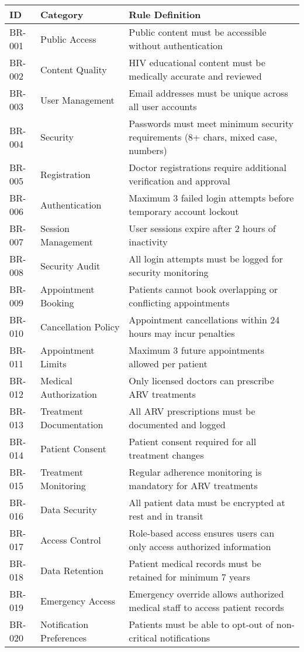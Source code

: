 \documentclass[12pt,a4paper]{article}
\begin{document}
\begin{longtable}{|p{2cm}|p{3cm}|p{9cm}|}
\hline
\textbf{ID} & \textbf{Category} & \textbf{Rule Definition} \\
\hline
BR-001 & Public Access & Public content must be accessible without authentication \\
\hline
BR-002 & Content Quality & HIV educational content must be medically accurate and reviewed \\
\hline
BR-003 & User Management & Email addresses must be unique across all user accounts \\
\hline
BR-004 & Security & Passwords must meet minimum security requirements (8+ chars, mixed case, numbers) \\
\hline
BR-005 & Registration & Doctor registrations require additional verification and approval \\
\hline
BR-006 & Authentication & Maximum 3 failed login attempts before temporary account lockout \\
\hline
BR-007 & Session Management & User sessions expire after 2 hours of inactivity \\
\hline
BR-008 & Security Audit & All login attempts must be logged for security monitoring \\
\hline
BR-009 & Appointment Booking & Patients cannot book overlapping or conflicting appointments \\
\hline
BR-010 & Cancellation Policy & Appointment cancellations within 24 hours may incur penalties \\
\hline
BR-011 & Appointment Limits & Maximum 3 future appointments allowed per patient \\
\hline
BR-012 & Medical Authorization & Only licensed doctors can prescribe ARV treatments \\
\hline
BR-013 & Treatment Documentation & All ARV prescriptions must be documented and logged \\
\hline
BR-014 & Patient Consent & Patient consent required for all treatment changes \\
\hline
BR-015 & Treatment Monitoring & Regular adherence monitoring is mandatory for ARV treatments \\
\hline
BR-016 & Data Security & All patient data must be encrypted at rest and in transit \\
\hline
BR-017 & Access Control & Role-based access ensures users can only access authorized information \\
\hline
BR-018 & Data Retention & Patient medical records must be retained for minimum 7 years \\
\hline
BR-019 & Emergency Access & Emergency override allows authorized medical staff to access patient records \\
\hline
BR-020 & Notification Preferences & Patients must be able to opt-out of non-critical notifications \\
\hline
\end{longtable}
\end{document}

